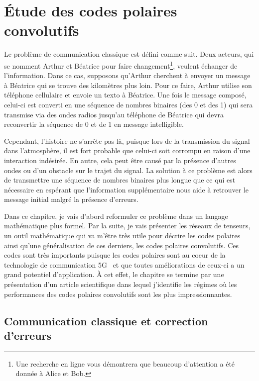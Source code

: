 \begin{comment}
\end{comment}

\chapter{Étude des codes polaires convolutifs}

Le problème de communication classique est défini comme suit.
Deux acteurs, 
qui se nomment Arthur et Béatrice pour faire changement\footnote{
  Une recherche en ligne vous démontrera que beaucoup d'attention a été donnée 
  à Alice et Bob. 
},
veulent échanger de l'information.
Dans ce cas,
supposons qu'Arthur cherchent à envoyer un message à Béatrice qui se trouve
des kilomètres plus loin.
Pour ce faire,
Arthur utilise son téléphone cellulaire et envoie un texto à Béatrice.
Une fois le message composé,
celui-ci est converti en une séquence de nombres binaires (des 0 et des 1)
qui sera transmise via des ondes radios jusqu'au téléphone de Béatrice
qui devra reconvertir la séquence de 0 et de 1 en message intelligible.

Cependant, 
l'histoire ne s'arrête pas là,
puisque lors de la transmission du signal dans l'atmosphère,
il est fort probable que celui-ci soit corrompu en 
raison d'une interaction indésirée.
En autre, 
cela peut être causé par la présence d'autres ondes ou d'un obstacle 
sur le trajet du signal.
La solution à ce problème est alors de transmettre une séquence de nombres binaires
plus longue que ce qui est nécessaire en espérant que l'information supplémentaire
nous aide à retrouver le message initial malgré la présence d'erreurs.

Dans ce chapitre,
je vais d'abord reformuler ce problème dans un langage mathématique plus formel.  
Par la suite, 
je vais présenter les réseaux de tenseurs,
un outil mathématique qui va m'être très utile pour décrire les codes polaires 
ainsi qu'une généralisation de ces derniers, les codes polaires convolutifs.
Ces codes sont très importants puisque les codes polaires sont au coeur 
de la technologie de communication 5G~\cite{bioglio_design_2021} et que toutes améliorations de ceux-ci
a un grand potentiel d'application.
À cet effet, le chapitre se termine par une présentation d'un article scientifique
dans lequel j'identifie les régimes où les performances des codes polaires convolutifs sont 
les plus impressionnantes.

\section{Communication classique et correction d'erreurs}

